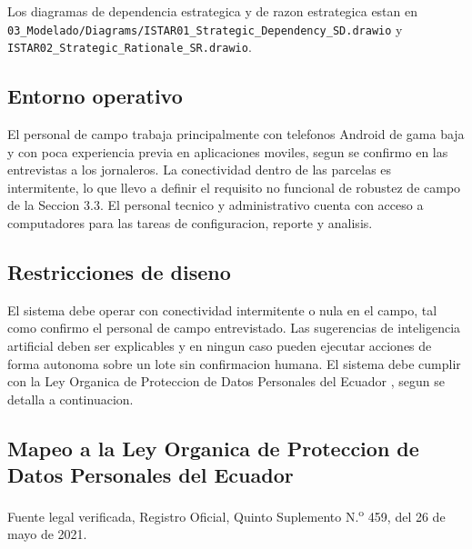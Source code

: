 \documentclass[11pt,a4paper]{article}
\newcommand{\ruta}[1]{\texttt{#1}}
\begin{document}
Los diagramas de dependencia estrategica y de razon estrategica estan en \ruta{03\_Modelado/Diagrams/ISTAR01\_Strategic\_Dependency\_SD.drawio} y \ruta{ISTAR02\_Strategic\_Rationale\_SR.drawio}.

\subsection{Entorno operativo}

El personal de campo trabaja principalmente con telefonos Android de gama baja y con poca experiencia previa en aplicaciones moviles, segun se confirmo en las entrevistas a los jornaleros. La conectividad dentro de las parcelas es intermitente, lo que llevo a definir el requisito no funcional de robustez de campo de la Seccion 3.3. El personal tecnico y administrativo cuenta con acceso a computadores para las tareas de configuracion, reporte y analisis.

\subsection{Restricciones de diseno}

El sistema debe operar con conectividad intermitente o nula en el campo, tal como confirmo el personal de campo entrevistado. Las sugerencias de inteligencia artificial deben ser explicables y en ningun caso pueden ejecutar acciones de forma autonoma sobre un lote sin confirmacion humana. El sistema debe cumplir con la Ley Organica de Proteccion de Datos Personales del Ecuador \cite{lopdp2021}, segun se detalla a continuacion.

\subsection{Mapeo a la Ley Organica de Proteccion de Datos Personales del Ecuador}

Fuente legal verificada, Registro Oficial, Quinto Suplemento N.\textsuperscript{o} 459, del 26 de mayo de 2021.
\end{document}
